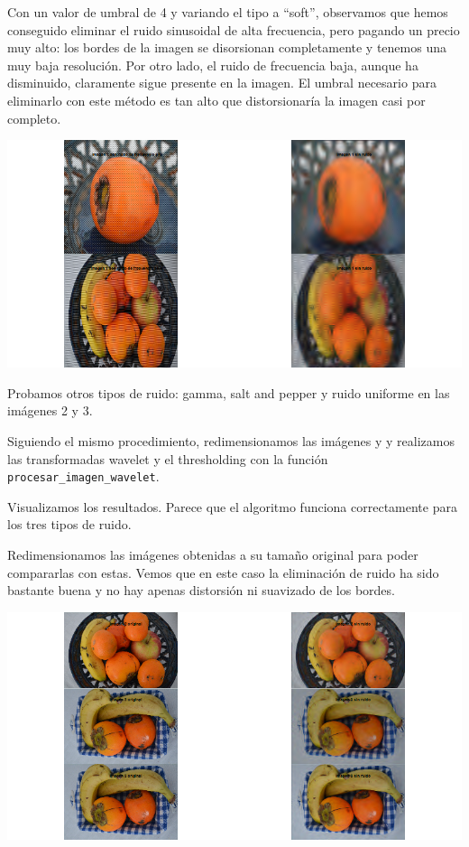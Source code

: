 \documentclass[
]{article}
\begin{document}
Con un valor de umbral de 4 y variando el tipo a ``soft'', observamos
que hemos conseguido eliminar el ruido sinusoidal de alta frecuencia,
pero pagando un precio muy alto: los bordes de la imagen se disorsionan
completamente y tenemos una muy baja resolución. Por otro lado, el ruido
de frecuencia baja, aunque ha disminuido, claramente sigue presente en
la imagen. El umbral necesario para eliminarlo con este método es tan
alto que distorsionaría la imagen casi por completo.

\begin{center}\includegraphics[width=1\linewidth]{imwd/image1_sinusoidal_manual} \end{center}

Probamos otros tipos de ruido: gamma, salt and pepper y ruido uniforme
en las imágenes 2 y 3.

Siguiendo el mismo procedimiento, redimensionamos las imágenes y y
realizamos las transformadas wavelet y el thresholding con la función
\texttt{procesar\_imagen\_wavelet}.

Visualizamos los resultados. Parece que el algoritmo funciona
correctamente para los tres tipos de ruido.

Redimensionamos las imágenes obtenidas a su tamaño original para poder
compararlas con estas. Vemos que en este caso la eliminación de ruido ha
sido bastante buena y no hay apenas distorsión ni suavizado de los
bordes.

\begin{center}\includegraphics[width=1\linewidth]{imwd/image1_otros_ruidos_original} \end{center}
\end{document}
